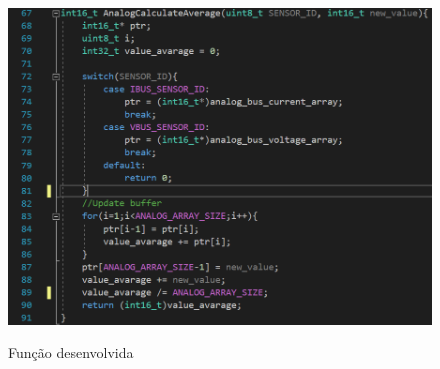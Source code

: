 \begin{figure}[H]
    \centering
    \caption{Função desenvolvida}
    \includegraphics[width=1\textwidth]{./dados/figuras/func_average}
    \label{fig:figura-func_average}
\end{figure}


